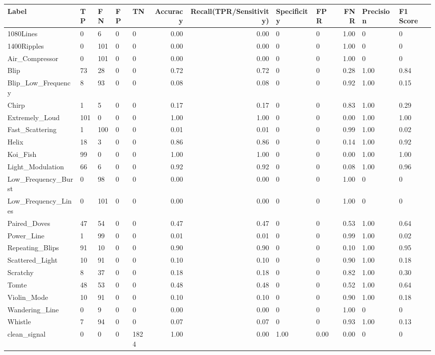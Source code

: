 \begin{tabular}{lllllrrllrll}
\toprule
Label & TP & FN & FP & TN & Accuracy & Recall(TPR/Sensitivity) & Specificity & FPR & FNR & Precision & F1 Score \\
\midrule
1080Lines & 0 & 6 & 0 & 0 & 0.00 & 0.00 & 0 & 0 & 1.00 & 0 & 0 \\
1400Ripples & 0 & 101 & 0 & 0 & 0.00 & 0.00 & 0 & 0 & 1.00 & 0 & 0 \\
Air_Compressor & 0 & 101 & 0 & 0 & 0.00 & 0.00 & 0 & 0 & 1.00 & 0 & 0 \\
Blip & 73 & 28 & 0 & 0 & 0.72 & 0.72 & 0 & 0 & 0.28 & 1.00 & 0.84 \\
Blip_Low_Frequency & 8 & 93 & 0 & 0 & 0.08 & 0.08 & 0 & 0 & 0.92 & 1.00 & 0.15 \\
Chirp & 1 & 5 & 0 & 0 & 0.17 & 0.17 & 0 & 0 & 0.83 & 1.00 & 0.29 \\
Extremely_Loud & 101 & 0 & 0 & 0 & 1.00 & 1.00 & 0 & 0 & 0.00 & 1.00 & 1.00 \\
Fast_Scattering & 1 & 100 & 0 & 0 & 0.01 & 0.01 & 0 & 0 & 0.99 & 1.00 & 0.02 \\
Helix & 18 & 3 & 0 & 0 & 0.86 & 0.86 & 0 & 0 & 0.14 & 1.00 & 0.92 \\
Koi_Fish & 99 & 0 & 0 & 0 & 1.00 & 1.00 & 0 & 0 & 0.00 & 1.00 & 1.00 \\
Light_Modulation & 66 & 6 & 0 & 0 & 0.92 & 0.92 & 0 & 0 & 0.08 & 1.00 & 0.96 \\
Low_Frequency_Burst & 0 & 98 & 0 & 0 & 0.00 & 0.00 & 0 & 0 & 1.00 & 0 & 0 \\
Low_Frequency_Lines & 0 & 101 & 0 & 0 & 0.00 & 0.00 & 0 & 0 & 1.00 & 0 & 0 \\
Paired_Doves & 47 & 54 & 0 & 0 & 0.47 & 0.47 & 0 & 0 & 0.53 & 1.00 & 0.64 \\
Power_Line & 1 & 99 & 0 & 0 & 0.01 & 0.01 & 0 & 0 & 0.99 & 1.00 & 0.02 \\
Repeating_Blips & 91 & 10 & 0 & 0 & 0.90 & 0.90 & 0 & 0 & 0.10 & 1.00 & 0.95 \\
Scattered_Light & 10 & 91 & 0 & 0 & 0.10 & 0.10 & 0 & 0 & 0.90 & 1.00 & 0.18 \\
Scratchy & 8 & 37 & 0 & 0 & 0.18 & 0.18 & 0 & 0 & 0.82 & 1.00 & 0.30 \\
Tomte & 48 & 53 & 0 & 0 & 0.48 & 0.48 & 0 & 0 & 0.52 & 1.00 & 0.64 \\
Violin_Mode & 10 & 91 & 0 & 0 & 0.10 & 0.10 & 0 & 0 & 0.90 & 1.00 & 0.18 \\
Wandering_Line & 0 & 9 & 0 & 0 & 0.00 & 0.00 & 0 & 0 & 1.00 & 0 & 0 \\
Whistle & 7 & 94 & 0 & 0 & 0.07 & 0.07 & 0 & 0 & 0.93 & 1.00 & 0.13 \\
clean_signal & 0 & 0 & 0 & 1824 & 1.00 & 0.00 & 1.00 & 0.00 & 0.00 & 0 & 0 \\
\bottomrule
\end{tabular}
